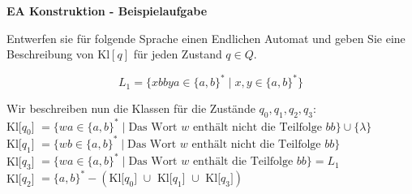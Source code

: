 \documentclass[a4paper, 11pt]{article}
\newcommand\myTitle[1]{{\large \textbf {#1}}}
\begin{document}
	\myTitle{EA Konstruktion - Beispielaufgabe}

	Entwerfen sie für folgende Sprache einen Endlichen Automat und geben Sie eine Beschreibung von Kl$[q]$ für jeden Zustand $q \in Q$.

	$$L_1 = \{xbbya \in \{a, b\}^* \mid x,y \in \{a, b\}^*\}$$


    Wir beschreiben nun die Klassen für die Zustände $q_0, q_1, q_2, q_3$:
    \\Kl[$q_0$] $= \{wa \in \{a,b\}^* \mid \text{Das Wort }w \text{ enthält nicht die Teilfolge } bb\} \cup \{\lambda\}$
    \\Kl[$q_1$] $= \{wb \in \{a,b\}^* \mid \text{Das Wort } w \text{ enthält nicht die Teilfolge } bb\}$
    \\Kl[$q_3$] $= \{wa \in \{a,b\}^* \mid \text{Das Wort } w \text{ enthält die Teilfolge } bb\} = L_1$
    \\Kl[$q_2$] $= \{a,b\}^* - (\text{Kl[$q_0$] $\cup $ Kl[$q_1$] $\cup $ Kl[$q_3$]})$
\end{document}
